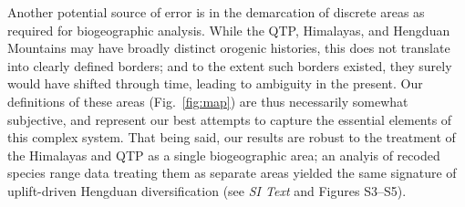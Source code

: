 Another potential source of error is in the demarcation of discrete
areas as required for biogeographic analysis. While the QTP,
Himalayas, and Hengduan Mountains may have broadly distinct orogenic
histories, this does not translate into clearly defined borders; and
to the extent such borders existed, they surely would have shifted
through time, leading to ambiguity in the present. Our definitions of
these areas (Fig.~\ref{fig:map}) are thus necessarily somewhat
subjective, and represent our best attempts to capture the essential
elements of this complex system. That being said, our results are
robust to the treatment of the Himalayas and QTP as a single
biogeographic area; an analyis of recoded species range data treating
them as separate areas yielded the same signature of uplift-driven
Hengduan diversification (see \textit{SI Text} and Figures S3--S5).








